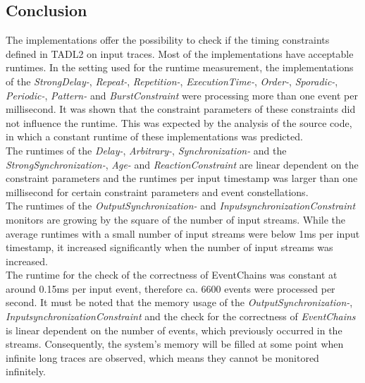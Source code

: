 \subsection{Conclusion}
	The implementations offer the possibility to check if the timing constraints defined in TADL2 on input traces. %
	Most of the implementations have acceptable runtimes. In the setting used for the runtime measurement, the implementations of the  \textit{StrongDelay-}, \textit{Repeat-}, \textit{Repetition-}, \textit{ExecutionTime-}, \textit{Order-}, \textit{Sporadic-}, \textit{Periodic-}, \textit{Pattern-} and \textit{BurstConstraint} were processing more than one event per millisecond. It was shown that the constraint parameters of these constraints did not influence the runtime. This was expected by the analysis of the source code, in which a constant runtime of these implementations was predicted.\\
	The runtimes of the \textit{Delay-}, \textit{Arbitrary-}, \textit{Synchronization-} and the \textit{StrongSynchronization-}, \textit{Age-} and \textit{ReactionConstraint} are linear dependent on the constraint parameters and the runtimes per input timestamp was larger than one millisecond for certain constraint parameters and event constellations.\\
	The runtimes of the \textit{OutputSynchronization-} and \textit{InputsynchronizationConstraint} monitors are growing by the square of the number of input streams. While the average runtimes with a small number of input streams were below 1ms per input timestamp, it increased significantly when the number of input streams was increased.\\
	The runtime for the check of the correctness of EventChains was constant at around 0.15ms per input event, therefore ca. 6600 events were processed per second. It must be noted that the memory usage of the \textit{OutputSynchronization-}, \textit{InputsynchronizationConstraint} and the check for the correctness of \textit{EventChains} is linear dependent on the number of events, which previously occurred in the streams. Consequently, the system's memory will be filled at some point when infinite long traces are observed, which means they cannot be monitored infinitely.
	
